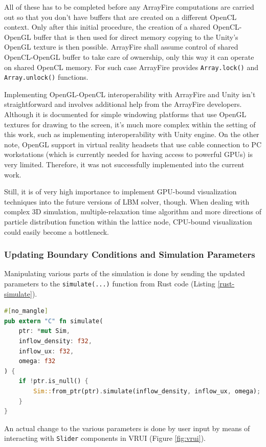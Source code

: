 All of these has to be completed before any ArrayFire computations are carried out so that you don't have buffers that are created on a different OpenCL context. Only after this initial procedure, the creation of a shared OpenCL-OpenGL buffer that is then used for direct memory copying to the Unity's OpenGL texture is then possible. ArrayFire shall assume control of shared OpenCL-OpenGL buffer to take care of ownership, only this way it can operate on shared OpenCL memory. For such case ArrayFire provides 
\texttt{Array.lock()} and \texttt{Array.unlock()} functions.

Implementing OpenGL-OpenCL interoperability with ArrayFire and Unity isn't straightforward and involves additional help from the ArrayFire developers. Although it is documented for simple windowing platforms that use OpenGL textures for drawing to the screen, it's much more complex within the setting of this work, such as implementing interoperability with Unity engine. On the other note, OpenGL support in virtual reality headsets that use cable connection to PC workstations (which is currently needed for having access to powerful GPUs) is very limited. Therefore, it was not successfully implemented into the current work. 

Still, it is of very high importance to implement GPU-bound visualization techniques into the future versions of LBM solver, though. When dealing with complex 3D simulation, multiple-relaxation time algorithm and more directions of particle distribution function within the lattice node, CPU-bound visualization could easily become a bottleneck.

\subsubsection{Updating Boundary Conditions and Simulation Parameters}
Manipulating various parts of the simulation is done by sending the updated parameters to the \texttt{simulate(...)} function from Rust code (Listing \ref{rust-simulate}).

\begin{lstlisting}[language=Rust, caption=".", label=rust-simulate]
#[no_mangle]
pub extern "C" fn simulate(
	ptr: *mut Sim,
	inflow_density: f32,
	inflow_ux: f32,
	omega: f32
) {
	if !ptr.is_null() {
		Sim::from_ptr(ptr).simulate(inflow_density, inflow_ux, omega);
	}
}
\end{lstlisting}

An actual change to the various parameters is done by user input by means of interacting with \texttt{Slider} components in VRUI (Figure \ref{fig:vrui}).

